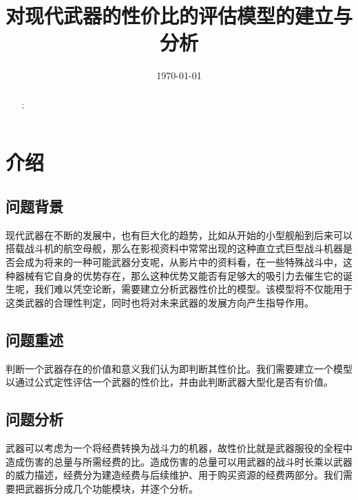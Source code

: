 \documentclass[UTF8]{mcmthesis}
\title{\large 对现代武器的性价比的评估模型的建立与分析}
\author{}
\date{\today}
\begin{document}
\begin{abstract}


\begin{keywords}
; \\ \hspace*{1.2cm}
\end{keywords}
\end{abstract}
\maketitle
\newpage                                                          
\begin{adjustwidth}{-1cm}{0cm}

\setcounter{tocdepth}{3}
\thispagestyle{empty}
\tableofcontents                                                  

\end{adjustwidth}


\newpage

\pagestyle{fancy}

\setcounter{page}{1}
\section{介绍}
\subsection{问题背景}

现代武器在不断的发展中，也有巨大化的趋势，比如从开始的小型舰船到后来可以搭载战斗机的航空母舰，那么在影视资料中常常出现的这种直立式巨型战斗机器是否会成为将来的一种可能武器分支呢，从影片中的资料看，在一些特殊战斗中，这种器械有它自身的优势存在，那么这种优势又能否有足够大的吸引力去催生它的诞生呢，我们难以凭空论断，需要建立分析武器性价比的模型。该模型将不仅能用于这类武器的合理性判定，同时也将对未来武器的发展方向产生指导作用。

\subsection{问题重述}

判断一个武器存在的价值和意义我们认为即判断其性价比。我们需要建立一个模型以通过公式定性评估一个武器的性价比，并由此判断武器大型化是否有价值。


\subsection{问题分析}
武器可以考虑为一个将经费转换为战斗力的机器，故性价比就是武器服役的全程中造成伤害的总量与所需经费的比。造成伤害的总量可以用武器的战斗时长乘以武器的威力描述，经费分为建造经费与后续维护、用于购买资源的经费两部分。我们需要把武器拆分成几个功能模块，并逐个分析。
\end{document}
